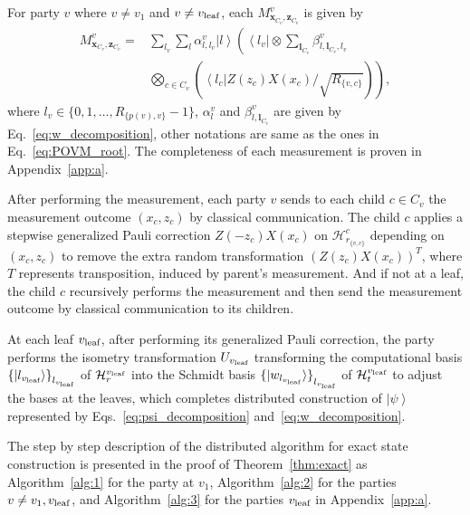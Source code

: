 \documentclass[preprintnumbers,aps,amsmath,amssymb,pra,twocolumn,showpacs,superscriptaddress,floatfix]{revtex4-1}
\def\Bra#1{\left\langle#1\right|}
\def\Ket#1{\left|#1\right\rangle}
\newcommand{\ket}[1]{|{#1}\rangle}
\theoremstyle{plain}
\theoremstyle{definition}
\theoremstyle{remark}
\begin{document}
For party $v$ where $v \neq v_1$ and $v \neq v_{\textup{leaf}}$, each $M^v_{\boldsymbol{x}_{C_v},\boldsymbol{z}_{C_v}}$ is given by
\begin{equation}
    \label{eq:POVM_each}
    \begin{split}
        M^v_{\boldsymbol{x}_{C_v},\boldsymbol{z}_{C_v}}  =&\sum_{l_v}\sum_{l} \alpha^{v}_{l,l_v}\Ket{l}\left(\Bra{l_v}\otimes\sum_{\boldsymbol{l}_{C_v}}\beta_{l,\boldsymbol{l}_{C_v},l_v}^{v}\right.\\
        &\left.\bigotimes_{c\in C_v}
        \left(\Bra{l_c}Z(z_c)X(x_c)/\sqrt{R_{\{v,c\}}}\right)
        \right),
\end{split}
\end{equation}
where $l_v \in \{0,1,\ldots,R_{\{p(v),v\}}-1 \}$, $\alpha^{v}_l$ and $\beta_{l,\boldsymbol{l}_{C_{v}}}^{v}$ are given by Eq.~\eqref{eq:w_decomposition}, other notations are same as the ones in Eq.~\eqref{eq:POVM_root}.  The completeness of each measurement is proven in Appendix~\ref{app:a}.

After performing the measurement, each party $v$ sends to each child $c\in C_v$ the measurement outcome $(x_c, z_c)$ by classical communication.   The child $c$ applies a stepwise generalized Pauli correction $Z(-z_c)X(x_c)$ on $\mathcal{H}^c_{r_{\{v,c\}}}$ depending on $(x_c, z_c)$ to remove the extra random transformation ${\left(Z(z_c)X(x_c)\right)}^T$, where $T$ represents transposition, induced by parent's measurement.   And if not at a leaf, the child $c$ recursively performs the measurement and then send the measurement outcome by classical communication to its children.  

At each leaf $v_{\textup{leaf}}$, after performing its generalized Pauli correction, the party performs the isometry transformation $U_{v_{\textup{leaf}}}$ transforming the computational basis ${\{ \ket{l_{v_{\textup{leaf}}}} \}}_{l_{v_{\textup{leaf}}}}$ of $\mathcal{H}^{v_{\textup{leaf}}}_r$ into the Schmidt basis ${\{ \ket{w_{l_{v_{\textup{leaf}}}}} \}}_{l_{v_{\textup{leaf}}}}$ of $\mathcal{H}^{v_{\textup{leaf}}}_t$ to adjust the bases at the leaves, which completes distributed construction of $\Ket{\psi}$ represented by Eqs.~\eqref{eq:psi_decomposition} and~\eqref{eq:w_decomposition}.

The step by step description of the distributed algorithm for exact state construction is presented in the proof of Theorem~\ref{thm:exact} as Algorithm~\ref{alg:1} for the party at $v_1$, Algorithm~\ref{alg:2} for the parties $v \neq v_1, v_{\textup{leaf}}$, and Algorithm~\ref{alg:3} for the parties $v_{\textup{leaf}}$ in Appendix~\ref{app:a}.
\end{document}
